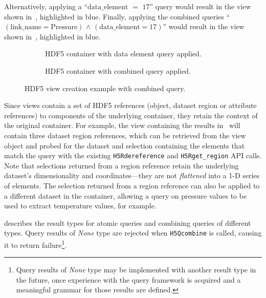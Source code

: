 Alternatively, applying a ``$\mathrm{data\_element}$ $\mathrm{=}$ $\mathrm{17}$''
query would result in the view shown in~, highlighted in blue.
Finally, applying the combined queries ``$\mathrm{(link\_name = Pressure)}$
$\mathrm{\land}$ $\mathrm{(data\_element = 17)}$''
would result in the view shown in~, highlighted in blue.

\begin{figure}
\begin{subfigure}[b]{.49\linewidth}
\centering
\resizebox{\textwidth}{!}{
  
}
\caption{HDF5 container with data element query applied.}
\label{fig:hdf5_view3}
\end{subfigure}
\hfill
\begin{subfigure}[b]{.49\linewidth}
\centering
\resizebox{\textwidth}{!}{
  
}
\caption{HDF5 container with combined query applied.}
\label{fig:hdf5_view4}
\end{subfigure}
\caption{HDF5 view creation example with combined query.}
\vspace{-20pt}
\end{figure}

Since views contain a set of HDF5 references (object,
dataset region or attribute references) to components of the underlying
container, they retain the context of the original container. For example, the
view containing the results in~ will contain three
dataset region references, which
can be retrieved from the view object and probed for the dataset and selection
containing the elements that match the query with the existing \texttt{H5Rdereference}
and \texttt{H5Rget\_region} API calls. Note that selections returned from a region
reference retain the underlying dataset's dimensionality and coordinates---they
are not \textit{flattened} into a 1-D series of elements. The selection returned
from a region reference can also be applied to a different dataset in the container,
allowing a query on pressure values to be used to extract temperature values,
for example.

 describes the result types for atomic queries and
combining queries of different types. Query results of \textit{None} type are rejected
when \texttt{H5Qcombine} is called, causing it to return failure\footnote{Query
results of \textit{None} type may be implemented with another result type in the
future, once experience with the query framework is acquired and a meaningful
grammar for those results are defined.}.

